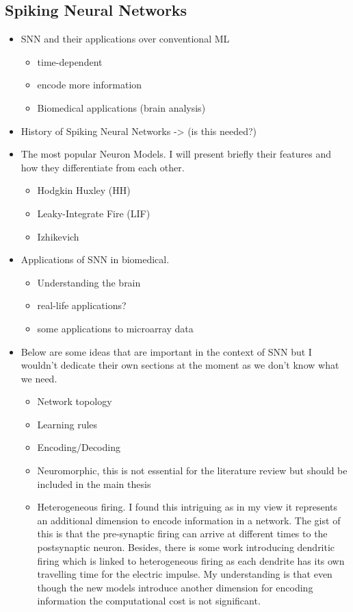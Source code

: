 \subsection{Spiking Neural Networks}

\begin{itemize}
\item SNN and their applications over conventional ML
    \begin{itemize}
      \item time-dependent 
      \item encode more information
      \item Biomedical applications (brain analysis)
    \end{itemize}
\item History of Spiking Neural Networks -> (is this needed?)
\item The most popular Neuron Models. I will present briefly their features and how they differentiate from each other. 
    \begin{itemize}
      \item Hodgkin Huxley (HH) 
      \item Leaky-Integrate Fire (LIF) 
      \item Izhikevich 
    \end{itemize}
\item Applications of SNN in biomedical. 
\begin{itemize}
  \item Understanding the brain
  \item real-life applications?
  \item some applications to microarray data
\end{itemize}
\item Below are some ideas that are important in the context of SNN but I wouldn’t dedicate their own sections at the moment as we don’t know what we need. 
    \begin{itemize}
     \item Network topology 
      \item Learning rules 
      \item Encoding/Decoding
      \item Neuromorphic, this is not essential for the literature review but should be included in the main thesis 
      \item Heterogeneous firing. I found this intriguing as in my view it represents an additional dimension to encode information in a network. The gist of this is that the pre-synaptic firing can arrive at different times to the postsynaptic neuron. Besides, there is some work introducing dendritic firing which is linked to heterogeneous firing as each dendrite has its own travelling time for the electric impulse. My understanding is that even though the new models introduce another dimension for encoding information the computational cost is not significant. 
     \end{itemize}
 
\end{itemize}
